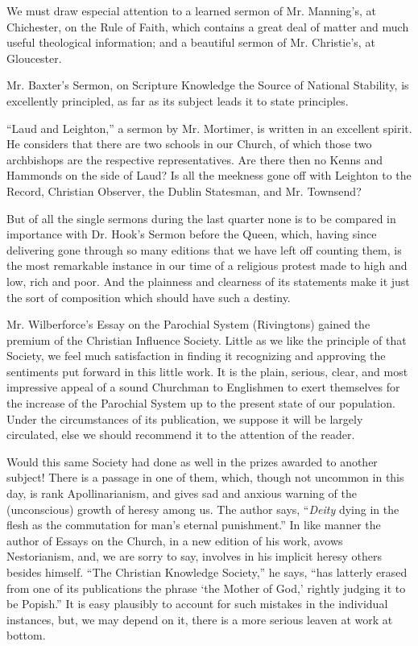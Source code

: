 We must draw especial attention to a learned sermon
of Mr. Manning's, at Chichester, on the Rule of Faith, which contains a
great deal of matter and much useful theological information; and a
beautiful sermon of Mr. Christie's, at Gloucester.

Mr. Baxter's Sermon, on Scripture Knowledge the
Source of National Stability, is excellently principled, as far as its
subject leads it to state principles.

``Laud and Leighton,'' a sermon by Mr. Mortimer, is
written in an excellent spirit. He considers that there are two schools
in our Church, of which those two archbishops are the respective
representatives. Are there then no Kenns and Hammonds on the side of
Laud? Is all the meekness gone off with Leighton to the Record,
Christian Observer, the Dublin Statesman, and Mr. Townsend?

But of all the single sermons during the last
quarter none is to be compared in importance with Dr. Hook's Sermon
before the Queen, which, having since delivering gone through so many
editions that we have left off counting them, is the most remarkable
instance in our time of a religious protest made to high and low, rich
and poor. And the plainness and clearness of its statements make it just
the sort of composition which should have such a destiny.

Mr. Wilberforce's Essay on the Parochial System
(Rivingtons) gained the premium of the Christian Influence Society.
Little as we like the principle of that Society, we feel much
satisfaction in finding it recognizing and approving the sentiments put
forward in this little work. It is the plain, serious, clear, and most
impressive appeal of a sound Churchman to Englishmen to exert themselves
for the increase of the Parochial System up to the present state of our
population. Under the circumstances of its publication, we suppose it
will be largely circulated, else we should recommend it to the attention
of the reader.

Would this same Society had done as well in the
prizes awarded to another subject! There is a passage in one of them,
which, though not uncommon in this day, is rank Apollinarianism, and
gives sad and anxious warning of the (unconscious) growth of heresy
among us. The author says, ``\emph{Deity} dying in the flesh as the
commutation for man's eternal punishment.'' In like manner the author of
Essays on the Church, in a new edition of his work, avows Nestorianism,
and, we are sorry to say, involves in his implicit heresy others besides
himself. ``The Christian Knowledge Society,'' he says, ``has latterly
erased from one of its publications the phrase ‘the Mother of God,'
rightly judging it to be Popish.'' It is easy plausibly to account for
such mistakes in the individual instances, but, we may depend on it,
there is a more serious leaven at work at bottom.

